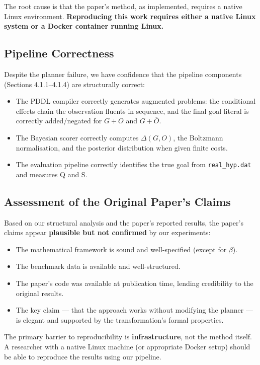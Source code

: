 \documentclass[10pt,twocolumn]{article}
\begin{document}
The root cause is that the paper's method, as implemented, requires a native Linux environment. \textbf{Reproducing this work requires either a native Linux system or a Docker container running Linux.}

\subsection{Pipeline Correctness}

Despite the planner failure, we have confidence that the pipeline components (Sections 4.1.1--4.1.4) are structurally correct:
\begin{itemize}
  \item The PDDL compiler correctly generates augmented problems: the conditional effects chain the observation fluents in sequence, and the final goal literal is correctly added/negated for $G{+}O$ and $G{+}\overline{O}$.
  \item The Bayesian scorer correctly computes $\Delta(G,O)$, the Boltzmann normalisation, and the posterior distribution when given finite costs.
  \item The evaluation pipeline correctly identifies the true goal from \texttt{real\_hyp.dat} and measures Q and S.
\end{itemize}

\subsection{Assessment of the Original Paper's Claims}

Based on our structural analysis and the paper's reported results, the paper's claims appear \textbf{plausible but not confirmed} by our experiments:

\begin{itemize}
  \item The mathematical framework is sound and well-specified (except for $\beta$).
  \item The benchmark data is available and well-structured.
  \item The paper's code was available at publication time, lending credibility to the original results.
  \item The key claim — that the approach works without modifying the planner — is elegant and supported by the transformation's formal properties.
\end{itemize}

The primary barrier to reproducibility is \textbf{infrastructure}, not the method itself. A researcher with a native Linux machine (or appropriate Docker setup) should be able to reproduce the results using our pipeline.
\end{document}
